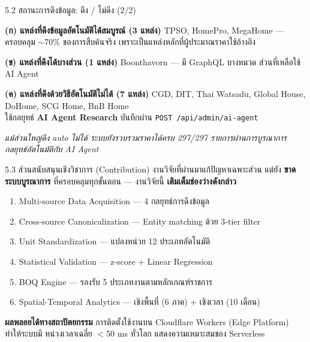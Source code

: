 \documentclass[aspectratio=169,11pt]{beamer}
\begin{document}
\begin{frame}{5.2 สถานะการดึงข้อมูล: ดึง / ไม่ดึง (2/2)}
  \footnotesize
  \begin{block}{\textbf{(ก) แหล่งที่ดึงข้อมูลอัตโนมัติได้สมบูรณ์ (3 แหล่ง)}}
    TPSO, HomePro, MegaHome --- ครอบคลุม $\sim$70\% ของการสืบค้นจริง
    เพราะเป็นแหล่งหลักที่ผู้ประมาณราคาใช้อ้างอิง
  \end{block}
  \begin{block}{\textbf{(ข) แหล่งที่ดึงได้บางส่วน (1 แหล่ง)}}
    Boonthavorn --- มี GraphQL บางหมวด ส่วนที่เหลือใช้ AI Agent
  \end{block}
  \begin{alertblock}{\textbf{(ค) แหล่งที่ดึงด้วยวิธีอัตโนมัติไม่ได้ (7 แหล่ง)}}
    CGD, DIT, Thai Watsadu, Global House, DoHome, SCG Home, BnB Home \\
    ใช้กลยุทธ์ \textbf{AI Agent Research} บันทึกผ่าน
    \texttt{POST /api/admin/ai-agent}
  \end{alertblock}
  \footnotesize\emph{แม้ส่วนใหญ่ดึง auto ไม่ได้ ระบบยังรวบรวมราคาได้ครบ
  297/297 รายการผ่านการบูรณาการกลยุทธ์อัตโนมัติกับ AI Agent}
\end{frame}

\begin{frame}{5.3 ส่วนสนับสนุนเชิงวิชาการ (Contribution)}
  งานวิจัยที่ผ่านมาแก้ปัญหาเฉพาะส่วน แต่ยัง \textbf{ขาดระบบบูรณาการ}
  ที่ครอบคลุมทุกขั้นตอน --- งานวิจัยนี้ \textbf{เติมเต็มช่องว่างดังกล่าว}
  \vspace{0.3em}
  \begin{enumerate}
    \item Multi-source Data Acquisition --- 4 กลยุทธ์การดึงข้อมูล
    \item Cross-source Canonicalization --- Entity matching ด้วย 3-tier filter
    \item Unit Standardization --- แปลงหน่วย 12 ประเภทอัตโนมัติ
    \item Statistical Validation --- z-score + Linear Regression
    \item BOQ Engine --- รองรับ 5 ประเภทงานตามหลักเกณฑ์ราชการ
    \item Spatial-Temporal Analytics --- เชิงพื้นที่ (6 ภาค) + เชิงเวลา (10 เดือน)
  \end{enumerate}
  \vspace{0.3em}
  \begin{block}{\textbf{ผลพลอยได้ทางสถาปัตยกรรม}}
    การติดตั้งใช้งานบน Cloudflare Workers (Edge Platform) ทำให้ระบบมี
    หน่วงเวลาเฉลี่ย $<$50 ms ทั่วโลก แสดงความเหมาะสมของ Serverless
  \end{block}
\end{frame}
\end{document}
